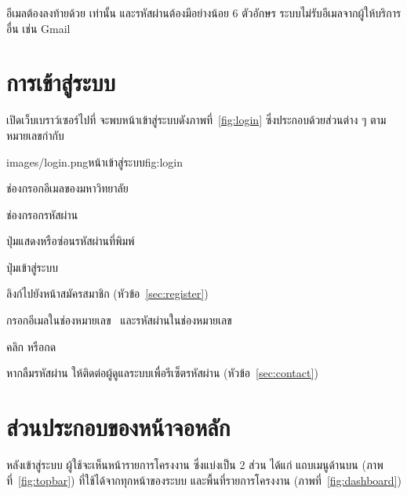 \begin{important}
อีเมลต้องลงท้ายด้วย  เท่านั้น และรหัสผ่านต้องมีอย่างน้อย 6 ตัวอักษร
ระบบไม่รับอีเมลจากผู้ให้บริการอื่น เช่น Gmail
\end{important}

\section{การเข้าสู่ระบบ}
\label{sec:login}

เปิดเว็บเบราว์เซอร์ไปที่ \systemurl{} จะพบหน้าเข้าสู่ระบบดังภาพที่~\ref{fig:login}
ซึ่งประกอบด้วยส่วนต่าง ๆ ตามหมายเลขกำกับ

\begin{screenshot}[width=0.52\linewidth]{images/login.png}{หน้าเข้าสู่ระบบ}{fig:login}
\end{screenshot}

\begin{calloutlist}
  \item ช่องกรอกอีเมลของมหาวิทยาลัย
  \item ช่องกรอกรหัสผ่าน
  \item ปุ่มแสดงหรือซ่อนรหัสผ่านที่พิมพ์
  \item ปุ่มเข้าสู่ระบบ
  \item ลิงก์ไปยังหน้าสมัครสมาชิก (หัวข้อ~\ref{sec:register})
\end{calloutlist}

\begin{steps}
  \item กรอกอีเมลในช่องหมายเลข~ และรหัสผ่านในช่องหมายเลข~
  \item คลิก  หรือกด 
\end{steps}

\begin{note}
หากลืมรหัสผ่าน ให้ติดต่อผู้ดูแลระบบเพื่อรีเซ็ตรหัสผ่าน (หัวข้อ~\ref{sec:contact})
\end{note}

\section{ส่วนประกอบของหน้าจอหลัก}
\label{sec:main-screen}

หลังเข้าสู่ระบบ ผู้ใช้จะเห็นหน้ารายการโครงงาน ซึ่งแบ่งเป็น 2 ส่วน ได้แก่
แถบเมนูด้านบน (ภาพที่~\ref{fig:topbar}) ที่ใช้ได้จากทุกหน้าของระบบ
และพื้นที่รายการโครงงาน (ภาพที่~\ref{fig:dashboard})

